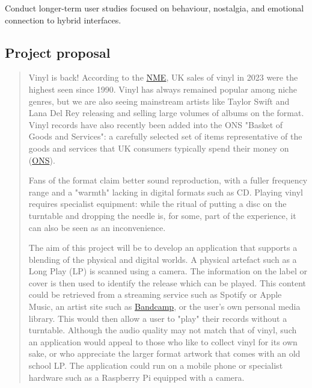            Conduct longer-term user studies focused on behaviour, nostalgia, and emotional connection to hybrid interfaces.
    
    \printbibliography[title={References},heading=bibintoc] %
    
    
    
    \begin{uomappendix} 
        \section{Project proposal}
    
            \begin{quote}
                Vinyl is back! According to the \href{https://www.nme.com/news/music/uk-vinyl-sales-2023-reach-highest-level-since-1990-3563676}{NME}, UK sales of vinyl in 2023 were the highest seen since 1990. Vinyl has always remained popular among niche genres, but we are also seeing mainstream artists like Taylor Swift and Lana Del Rey releasing and selling large volumes of albums on the format. Vinyl records have also recently been added into the ONS "Basket of Goods and Services": a carefully selected set of items representative of the goods and services that UK consumers typically spend their money on (\href{https://www.ons.gov.uk/news/news/arecordrevivalthatscookingupastormvinylmusicandairfryersspintheirwayintothebasketofgoods}{ONS}).
                
                Fans of the format claim better sound reproduction, with a fuller frequency range and a "warmth" lacking in digital formats such as CD. Playing vinyl requires specialist equipment: while the ritual of putting a disc on the turntable and dropping the needle is, for some, part of the experience, it can also be seen as an inconvenience.
                
                The aim of this project will be to develop an application that supports a blending of the physical and digital worlds. A physical artefact such as a Long Play (LP) is scanned using a camera. The information on the label or cover is then used to identify the release which can be played. This content could be retrieved from a streaming service such as Spotify or Apple Music, an artist site such as \href{https://bandcamp.com/}{Bandcamp}, or the user's own personal media library. This would then allow a user to "play" their records without a turntable. Although the audio quality may not match that of vinyl, such an application would appeal to those who like to collect vinyl for its own sake, or who appreciate the larger format artwork that comes with an old school LP. The application could run on a mobile phone or specialist hardware such as a Raspberry Pi equipped with a camera.
                

\end{quote}
\end{uomappendix}
